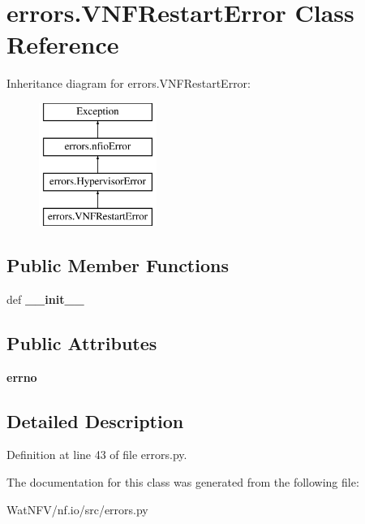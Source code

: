 \hypertarget{classerrors_1_1VNFRestartError}{\section{errors.\-V\-N\-F\-Restart\-Error Class Reference}
\label{classerrors_1_1VNFRestartError}
}
Inheritance diagram for errors.\-V\-N\-F\-Restart\-Error\-:\begin{figure}[H]
\begin{center}
\leavevmode
\includegraphics[height=4.000000cm]{classerrors_1_1VNFRestartError}
\end{center}
\end{figure}
\subsection*{Public Member Functions}
\begin{DoxyCompactItemize}
\item 
\hypertarget{classerrors_1_1VNFRestartError_a4d4c49c81e3d12b08a271f70daeb8d05}{def {\bfseries \-\_\-\-\_\-init\-\_\-\-\_\-}}\label{classerrors_1_1VNFRestartError_a4d4c49c81e3d12b08a271f70daeb8d05}

\end{DoxyCompactItemize}
\subsection*{Public Attributes}
\begin{DoxyCompactItemize}
\item 
\hypertarget{classerrors_1_1VNFRestartError_abf021cdb7d3eb3d6273735b201491c4d}{{\bfseries errno}}\label{classerrors_1_1VNFRestartError_abf021cdb7d3eb3d6273735b201491c4d}

\end{DoxyCompactItemize}


\subsection{Detailed Description}


Definition at line 43 of file errors.\-py.



The documentation for this class was generated from the following file\-:\begin{DoxyCompactItemize}
\item 
Wat\-N\-F\-V/nf.\-io/src/errors.\-py\end{DoxyCompactItemize}
